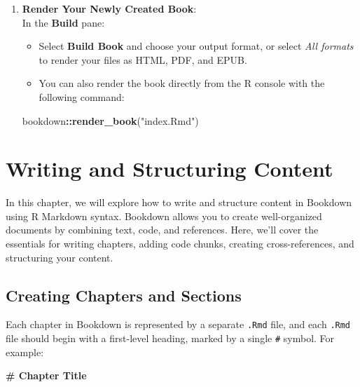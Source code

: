 \documentclass[
]{book}
\newenvironment{Shaded}{\begin{snugshade}}{\end{snugshade}}
\newcommand{\FunctionTok}[1]{\textcolor[rgb]{0.13,0.29,0.53}{\textbf{#1}}}
\newcommand{\NormalTok}[1]{#1}
\newcommand{\SpecialCharTok}[1]{\textcolor[rgb]{0.81,0.36,0.00}{\textbf{#1}}}
\newcommand{\StringTok}[1]{\textcolor[rgb]{0.31,0.60,0.02}{#1}}
\providecommand{\tightlist}{%
  \setlength{\itemsep}{0pt}\setlength{\parskip}{0pt}}
\theoremstyle{definition}
\theoremstyle{definition}
\theoremstyle{definition}
\theoremstyle{definition}
\theoremstyle{remark}
\begin{document}
\begin{enumerate}
\def\labelenumi{\arabic{enumi}.}
\setcounter{enumi}{5}
\tightlist
\item
  \textbf{Render Your Newly Created Book}:\\
  In the \textbf{Build} pane:

  \begin{itemize}
  \tightlist
  \item
    Select \textbf{Build Book} and choose your output format, or select \emph{All formats} to render your files as HTML, PDF, and EPUB.
  \item
    You can also render the book directly from the R console with the following command:
  \end{itemize}

\begin{Shaded}
\begin{Highlighting}[]
\NormalTok{bookdown}\SpecialCharTok{::}\FunctionTok{render\_book}\NormalTok{(}\StringTok{"index.Rmd"}\NormalTok{)}
\end{Highlighting}
\end{Shaded}
\end{enumerate}

\chapter{Writing and Structuring Content}\label{writing-and-structuring-content}

In this chapter, we will explore how to write and structure content in Bookdown using R Markdown syntax. Bookdown allows you to create well-organized documents by combining text, code, and references. Here, we'll cover the essentials for writing chapters, adding code chunks, creating cross-references, and structuring your content.

\section{Creating Chapters and Sections}\label{creatingchapters}

Each chapter in Bookdown is represented by a separate \texttt{.Rmd} file, and each \texttt{.Rmd} file should begin with a first-level heading, marked by a single \texttt{\#} symbol. For example:

\begin{Shaded}
\begin{Highlighting}[]
\FunctionTok{\# Chapter Title}
\end{Highlighting}
\end{Shaded}
\end{document}
